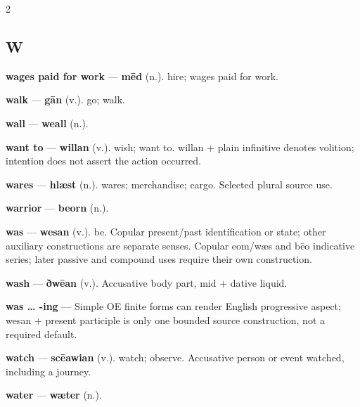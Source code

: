 \begin{multicols}{2}
\subsection*{W}
\textbf{wages paid for work} — \textbf{mēd} (n.). hire; wages paid for work.\par
\textbf{walk} — \textbf{gān} (v.). go; walk.\par
\textbf{wall} — \textbf{weall} (n.).\par
\textbf{want to} — \textbf{willan} (v.). wish; want to. willan + plain infinitive denotes volition; intention does not assert the action occurred.\par
\textbf{wares} — \textbf{hlæst} (n.). wares; merchandise; cargo. Selected plural source use.\par
\textbf{warrior} — \textbf{beorn} (n.).\par
\textbf{was} — \textbf{wesan} (v.). be. Copular present/past identification or state; other auxiliary constructions are separate senses. Copular eom/wæs and bēo indicative series; later passive and compound uses require their own construction.\par
\textbf{wash} — \textbf{ðwēan} (v.). Accusative body part, mid + dative liquid.\par
\textbf{was … -ing} — Simple OE finite forms can render English progressive aspect; wesan + present participle is only one bounded source construction, not a required default.\par
\textbf{watch} — \textbf{scēawian} (v.). watch; observe. Accusative person or event watched, including a journey.\par
\textbf{water} — \textbf{wæter} (n.).\par

\end{multicols}
